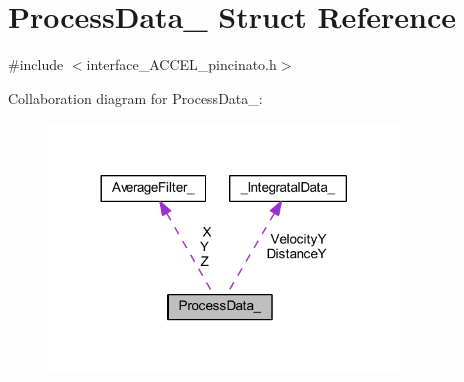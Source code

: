 \hypertarget{struct_process_data__}{}\section{Process\+Data\+\_\+ Struct Reference}
\label{struct_process_data__}


{\ttfamily \#include $<$interface\+\_\+\+A\+C\+C\+E\+L\+\_\+pincinato.\+h$>$}



Collaboration diagram for Process\+Data\+\_\+\+:\nopagebreak
\begin{figure}[H]
\begin{center}
\leavevmode
\includegraphics[width=264pt]{struct_process_data____coll__graph}
\end{center}
\end{figure}
